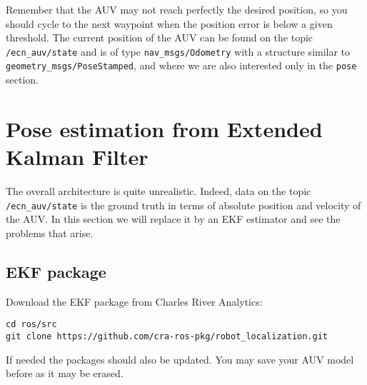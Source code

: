 \documentclass{ecnreport}
\begin{document}
Remember that the AUV may not reach perfectly the desired position, so you should cycle to the next waypoint when the position error is below a given threshold.
The current position of the AUV can be found on the topic \texttt{/ecn\_auv/state} and is of type \texttt{nav\_msgs/Odometry} with a structure similar to \texttt{geometry\_msgs/PoseStamped}, and where we are also interested only
in the \texttt{pose} section.

\newpage

\section{Pose estimation from Extended Kalman Filter}

The overall architecture is quite unrealistic. Indeed, data on the topic \texttt{/ecn\_auv/state} is the ground truth in terms of absolute position and velocity of the AUV.
In this section we will replace it by an EKF estimator and see the problems that arise.

\subsection{EKF package}

Download the EKF package from Charles River Analytics:

\begin{center}
\begin{lstlisting}
cd ros/src
git clone https://github.com/cra-ros-pkg/robot_localization.git
\end{lstlisting}
\end{center}

If needed the packages should also be updated. You may save your AUV model before as it may be erased.
\end{document}
